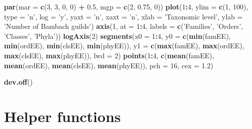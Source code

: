 \documentclass[]{article}
\newenvironment{Shaded}{\begin{snugshade}}{\end{snugshade}}
\newcommand{\KeywordTok}[1]{\textcolor[rgb]{0.13,0.29,0.53}{\textbf{#1}}}
\newcommand{\DataTypeTok}[1]{\textcolor[rgb]{0.13,0.29,0.53}{#1}}
\newcommand{\DecValTok}[1]{\textcolor[rgb]{0.00,0.00,0.81}{#1}}
\newcommand{\FloatTok}[1]{\textcolor[rgb]{0.00,0.00,0.81}{#1}}
\newcommand{\StringTok}[1]{\textcolor[rgb]{0.31,0.60,0.02}{#1}}
\newcommand{\OperatorTok}[1]{\textcolor[rgb]{0.81,0.36,0.00}{\textbf{#1}}}
\newcommand{\NormalTok}[1]{#1}
\begin{document}
\begin{Shaded}
\begin{Highlighting}[]
\KeywordTok{par}\NormalTok{(}\DataTypeTok{mar =} \KeywordTok{c}\NormalTok{(}\DecValTok{3}\NormalTok{, }\DecValTok{3}\NormalTok{, }\DecValTok{0}\NormalTok{, }\DecValTok{0}\NormalTok{) }\OperatorTok{+}\StringTok{ }\FloatTok{0.5}\NormalTok{, }\DataTypeTok{mgp =} \KeywordTok{c}\NormalTok{(}\DecValTok{2}\NormalTok{, }\FloatTok{0.75}\NormalTok{, }\DecValTok{0}\NormalTok{))}
\KeywordTok{plot}\NormalTok{(}\DecValTok{1}\OperatorTok{:}\DecValTok{4}\NormalTok{, }\DataTypeTok{ylim =} \KeywordTok{c}\NormalTok{(}\DecValTok{1}\NormalTok{, }\DecValTok{100}\NormalTok{), }\DataTypeTok{type =} \StringTok{'n'}\NormalTok{, }\DataTypeTok{log =} \StringTok{'y'}\NormalTok{, }\DataTypeTok{yaxt =} \StringTok{'n'}\NormalTok{, }\DataTypeTok{xaxt =} \StringTok{'n'}\NormalTok{,}
     \DataTypeTok{xlab =} \StringTok{'Taxonomic level'}\NormalTok{, }\DataTypeTok{ylab =} \StringTok{'Number of Bambach guilds'}\NormalTok{)}
\KeywordTok{axis}\NormalTok{(}\DecValTok{1}\NormalTok{, }\DataTypeTok{at =} \DecValTok{1}\OperatorTok{:}\DecValTok{4}\NormalTok{, }\DataTypeTok{labels =} \KeywordTok{c}\NormalTok{(}\StringTok{'Families'}\NormalTok{, }\StringTok{'Orders'}\NormalTok{, }\StringTok{'Classes'}\NormalTok{, }\StringTok{'Phyla'}\NormalTok{))}
\KeywordTok{logAxis}\NormalTok{(}\DecValTok{2}\NormalTok{)}
\KeywordTok{segments}\NormalTok{(}\DataTypeTok{x0 =} \DecValTok{1}\OperatorTok{:}\DecValTok{4}\NormalTok{, }\DataTypeTok{y0 =} \KeywordTok{c}\NormalTok{(}\KeywordTok{min}\NormalTok{(famEE), }\KeywordTok{min}\NormalTok{(ordEE), }\KeywordTok{min}\NormalTok{(clsEE), }\KeywordTok{min}\NormalTok{(phyEE)), }
         \DataTypeTok{y1 =} \KeywordTok{c}\NormalTok{(}\KeywordTok{max}\NormalTok{(famEE), }\KeywordTok{max}\NormalTok{(ordEE), }\KeywordTok{max}\NormalTok{(clsEE), }\KeywordTok{max}\NormalTok{(phyEE)), }\DataTypeTok{lwd =} \DecValTok{2}\NormalTok{)}
\KeywordTok{points}\NormalTok{(}\DecValTok{1}\OperatorTok{:}\DecValTok{4}\NormalTok{, }\KeywordTok{c}\NormalTok{(}\KeywordTok{mean}\NormalTok{(famEE), }\KeywordTok{mean}\NormalTok{(ordEE), }\KeywordTok{mean}\NormalTok{(clsEE), }\KeywordTok{mean}\NormalTok{(phyEE)), }\DataTypeTok{pch =} \DecValTok{16}\NormalTok{, }\DataTypeTok{cex =} \FloatTok{1.2}\NormalTok{)}

\KeywordTok{dev.off}\NormalTok{()}
\end{Highlighting}
\end{Shaded}

\section{Helper functions}\label{helper-functions}
\end{document}
